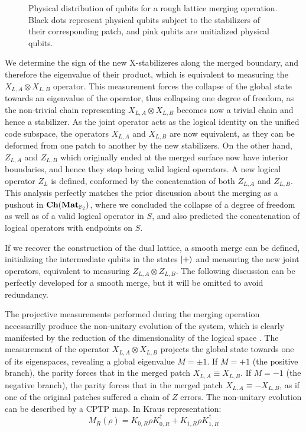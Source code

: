 \documentclass[12pt, twoside, openany]{book}
\newcommand{\catname}[1]{{\normalfont\textbf{#1}}}
\newcommand{\Ch}{\catname{Ch}}
\newcommand{\Mat}{\catname{Mat}}
\begin{document}
\begin{figure} [ht]
    \centering
    
    \caption{Physical distribution of qubits for a rough lattice merging operation. Black dots represent physical qubits subject to the stabilizers of their corresponding patch, and pink qubits are unitialized physical qubits.}
    \label{fig:rough_merging}
\end{figure}

We determine the sign of the new X-stabilizeres along the merged boundary, and therefore the eigenvalue of their product, which is equivalent to measuring the $X_{L,A} \otimes X_{L,B}$ operator. This measurement forces the collapse of the global state towards an eigenvalue of the operator, thus collapsing one degree of freedom, as the non-trivial chain representing $X_{L,A} \otimes X_{L,B}$ becomes now a trivial chain and hence a stabilizer. As the joint operator acts as the logical identity on the unified code subspace, the operators $X_{L,A}$ and $X_{L,B}$ are now equivalent, as they can be deformed from one patch to another by the new stabilizers. On the other hand, $Z_{L,A}$ and $Z_{L,B}$ which originally ended at the merged surface now have interior boundaries, and hence they stop being valid logical operators. A new logical operator $Z_L$ is defined, conformed by the concatenation of both $Z_{L,A}$ and $Z_{L,B}$. This analysis perfectly matches the prior discussion about the merging as a pushout in $\Ch(\Mat_{\mathbb{F}_2})$, where we concluded the collapse of a degree of freedom as well as of a valid logical operator in $S$, and also predicted the concatenation of logical operators with endpoints on $S$. 

If we recover the construction of the dual lattice, a smooth merge can be defined, initializing the intermediate qubits in the states $\ket{+}$ and measuring the new joint operators, equivalent to measuring $Z_{L,A} \otimes Z_{L,B}$. The following discussion can be perfectly developed for a smooth merge, but it will be omitted to avoid redundancy.

The projective measurements performed during the merging operation necessarilly produce the non-unitary evolution of the system, which is clearly manifested by the reduction of the dimensionality of the logical space \cite{deBeaudrap2020}. The measurement of the operator $X_{L,A} \otimes X_{L,B}$ projects the global state towards one of its eigenspaces, revealing a global eigenvalue $M = \pm 1$. If $M = +1$ (the positive branch), the parity forces that in the merged patch $X_{L,A} \equiv X_{L,B}$. If $M = -1$ (the negative branch), the parity forces that in the merged patch $X_{L,A} \equiv -X_{L,B}$, as if one of the original patches suffered a chain of $Z$ errors. The non-unitary evolution can be described by a CPTP map. In Kraus representation:
\begin{equation}
    M_R(\rho) = K_{0,R} \rho K_{0,R}^\dagger + K_{1,R} \rho K_{1,R}^\dagger 
\end{equation}
\end{document}
